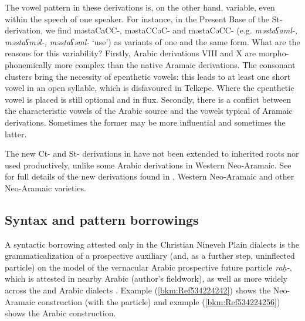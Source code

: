 \documentclass[output=paper]{langsci/langscibook}
\begin{document}
The vowel pattern in these derivations is, on the other hand, variable, even within the speech of one speaker. For instance, in the Present Base of the St-{derivation}, we find məstaCaCC-, məstaCCəC- and məstaCəCC- (e.g. \textit{məstaʕaml-,} \textit{məstaʕməl-,} \textit{məstaʕəml-} ‘use’) as variants of one and the same form. What are the reasons for this variability? Firstly, Arabic derivations VIII and X are morpho-phonemically more complex than the native Aramaic derivations. The {consonant clusters} bring the necessity of epenthetic vowels: this leads to at least one short vowel in an open syllable, which is disfavoured in Telkepe. Where the epenthetic vowel is placed is still optional and in flux. Secondly, there is a conflict between the characteristic vowels of the  Arabic source and the vowels typical of Aramaic derivations. Sometimes the former may be more influential and sometimes the latter.

The new Ct- and St- derivations in  have not been extended to inherited {roots} nor used productively, unlike some Arabic derivations in {Western} Neo-Aramaic. See \citet{Coghill2015} for full details of the new derivations found in , {Western} Neo-Aramaic and other Neo-Aramaic varieties.

\subsection{\label{bkm:Ref534214095}Syntax and pattern borrowings}

A syntactic borrowing attested only in the Christian Nineveh Plain dialects is the {grammaticalization} of a {prospective} auxiliary (and, as a further step, uninflected particle) on the model of the vernacular Arabic {prospective} {future} particle \textit{raḥ-}, which is attested in nearby  Arabic (author’s fieldwork), as well as more widely across the  and  Arabic dialects \citep[304]{Jastrow1978}. Example (\ref{bkm:Ref534224242}) shows the Neo-Aramaic construction (with the particle) and example (\ref{bkm:Ref534224256}) shows the Arabic construction.

\end{document}
